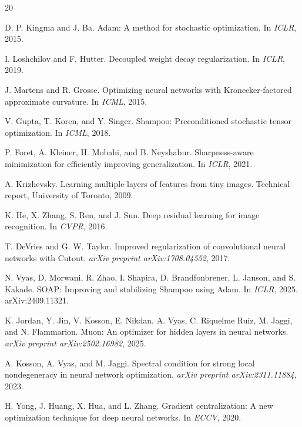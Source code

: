 \documentclass[10pt,twocolumn]{article}
\begin{document}


\begin{thebibliography}{20}

D. P. Kingma and J. Ba.
Adam: A method for stochastic optimization.
In \textit{ICLR}, 2015.

I. Loshchilov and F. Hutter.
Decoupled weight decay regularization.
In \textit{ICLR}, 2019.

J. Martens and R. Grosse.
Optimizing neural networks with Kronecker-factored approximate curvature.
In \textit{ICML}, 2015.

V. Gupta, T. Koren, and Y. Singer.
Shampoo: Preconditioned stochastic tensor optimization.
In \textit{ICML}, 2018.

P. Foret, A. Kleiner, H. Mobahi, and B. Neyshabur.
Sharpness-aware minimization for efficiently improving generalization.
In \textit{ICLR}, 2021.

A. Krizhevsky.
Learning multiple layers of features from tiny images.
Technical report, University of Toronto, 2009.

K. He, X. Zhang, S. Ren, and J. Sun.
Deep residual learning for image recognition.
In \textit{CVPR}, 2016.

T. DeVries and G. W. Taylor.
Improved regularization of convolutional neural networks with Cutout.
\textit{arXiv preprint arXiv:1708.04552}, 2017.

N. Vyas, D. Morwani, R. Zhao, I. Shapira, D. Brandfonbrener, L. Janson, and S. Kakade.
SOAP: Improving and stabilizing Shampoo using Adam.
In \textit{ICLR}, 2025. arXiv:2409.11321.

K. Jordan, Y. Jin, V. Kosson, E. Nikdan, A. Vyas, C. Riquelme Ruiz, M. Jaggi, and N. Flammarion.
Muon: An optimizer for hidden layers in neural networks.
\textit{arXiv preprint arXiv:2502.16982}, 2025.

A. Kosson, A. Vyas, and M. Jaggi.
Spectral condition for strong local nondegeneracy in neural network optimization.
\textit{arXiv preprint arXiv:2311.11884}, 2023.

H. Yong, J. Huang, X. Hua, and L. Zhang.
Gradient centralization: A new optimization technique for deep neural networks.
In \textit{ECCV}, 2020.


\end{thebibliography}
\end{document}
